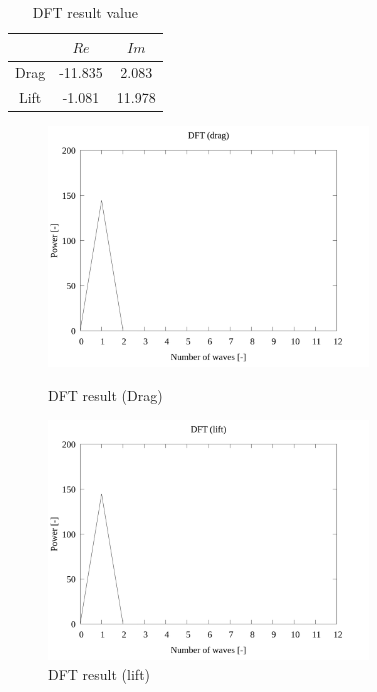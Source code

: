 \documentclass[twocolumn,a4j]{jsarticle}
\begin{document}
\begin{table}[htbp]
    \begin{center}
        \caption{DFT result value }
        \begin{tabular}{|p{30mm}|p{20mm}|p{20mm}|}
            \hline
            \multicolumn{1}{|c|}{}     & \multicolumn{1}{|c|}{$Re$}    & \multicolumn{1}{|c|}{$Im$}   \\ \hline
            \multicolumn{1}{|c|}{Drag} & \multicolumn{1}{|c|}{-11.835} & \multicolumn{1}{|c|}{2.083}  \\ \hline
            \multicolumn{1}{|c|}{Lift} & \multicolumn{1}{|c|}{-1.081}  & \multicolumn{1}{|c|}{11.978} \\ \hline
        \end{tabular}
    \end{center}
\end{table}

\newpage

\begin{figure}[htbp]
    \begin{center}
        \includegraphics[width=85mm]{../../../02_workspace/result/simulation_tx=10.0_ty=-5.0_dx=5.00_dy=-2.50/plot/07/07-3_dft-drag.png}
        \caption{DFT result (Drag) }
        \includegraphics[width=85mm]{../../../02_workspace/result/simulation_tx=10.0_ty=-5.0_dx=5.00_dy=-2.50/plot/07/07-4_dft-lift.png}
        \caption{DFT result (lift) }
    \end{center}
\end{figure}
\end{document}
